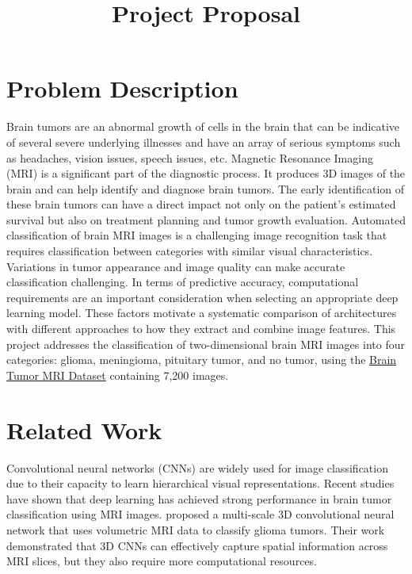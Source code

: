 \documentclass[11pt,letterpaper]{article}
\title{\vspace{-1.5em}\Large\bfseries Project Proposal\vspace{-0.5em}}
\author{\teamauthors}
\date{}
\begin{document}
\maketitle
\vspace{-2em}

\section*{Problem Description}
Brain tumors are an abnormal growth of cells in the brain that can be indicative of several severe underlying illnesses and have an array of serious 
symptoms such as headaches, vision issues, speech issues, etc. Magnetic Resonance Imaging (MRI) is a significant part of the diagnostic process. 
It produces 3D images of the brain and can help identify and diagnose brain tumors. The early identification of these brain tumors can have a direct 
impact not only on the patient's estimated survival but also on treatment planning and tumor growth evaluation. Automated classification of brain 
MRI images is a challenging image recognition task that requires classification between categories with similar visual 
characteristics. Variations in tumor appearance and image quality can make accurate classification challenging. In terms of predictive accuracy, 
computational requirements are an important consideration when selecting an appropriate deep learning model. These factors motivate a systematic 
comparison of architectures with different approaches to how they extract and combine image features. This project addresses the classification of 
two-dimensional brain MRI images into four categories: glioma, meningioma, pituitary tumor, and no tumor, using the 
\href{https://www.kaggle.com/datasets/masoudnickparvar/brain-tumor-mri-dataset}{Brain Tumor MRI Dataset} containing 7,200 images.

\section*{Related Work}
Convolutional neural networks (CNNs) are widely used for image classification due to their capacity to learn hierarchical visual representations.
Recent studies have shown that deep learning has achieved strong performance in brain tumor classification using MRI images. 
\citet{mzoughi2020} proposed a multi-scale 3D convolutional neural network that uses volumetric MRI data to classify glioma tumors. 
Their work demonstrated that 3D CNNs can effectively capture spatial information across MRI slices, but they also require more computational 
resources. 
\end{document}
